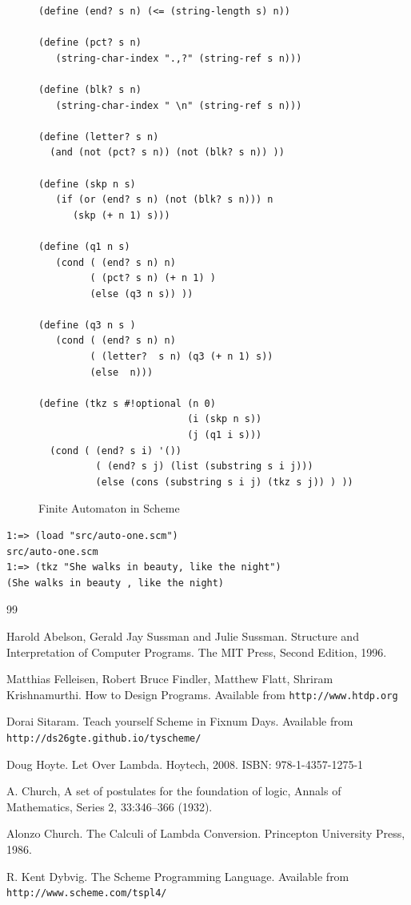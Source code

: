 \documentclass[a4paper,12pt]{book}
\newenvironment{fmpage}[1]
           {\begin{lrbox}{\fmbox}\begin{minipage}{#1}}
           {\end{minipage}\end{lrbox}\fbox{\usebox{\fmbox}}}
\begin{document}
\begin{figure}[!h]
\begin{fmpage}{0.9\linewidth}
\begin{verbatim}
(define (end? s n) (<= (string-length s) n))

(define (pct? s n)
   (string-char-index ".,?" (string-ref s n)))

(define (blk? s n)
   (string-char-index " \n" (string-ref s n)))

(define (letter? s n)
  (and (not (pct? s n)) (not (blk? s n)) ))

(define (skp n s)
   (if (or (end? s n) (not (blk? s n))) n
      (skp (+ n 1) s)))

(define (q1 n s)
   (cond ( (end? s n) n)
         ( (pct? s n) (+ n 1) )
         (else (q3 n s)) ))

(define (q3 n s )
   (cond ( (end? s n) n)
         ( (letter?  s n) (q3 (+ n 1) s))
         (else  n)))

(define (tkz s #!optional (n 0) 
                          (i (skp n s))
                          (j (q1 i s)))
  (cond ( (end? s i) '())
          ( (end? s j) (list (substring s i j)))
          (else (cons (substring s i j) (tkz s j)) ) ))

\end{verbatim}
\end{fmpage}
\caption{Finite Automaton in Scheme}
\label{FA-in-Scheme}
\end{figure}

\begin{verbatim}
1:=> (load "src/auto-one.scm")
src/auto-one.scm
1:=> (tkz "She walks in beauty, like the night")
(She walks in beauty , like the night)
\end{verbatim}


\begin{thebibliography}{99}


 Harold Abelson, Gerald Jay Sussman and
Julie Sussman. Structure and Interpretation of
Computer Programs. The MIT Press, Second Edition, 1996.

 Matthias Felleisen,
Robert Bruce Findler, Matthew Flatt, Shriram Krishnamurthi.
How to Design Programs.
Available from \verb|http://www.htdp.org|

 Dorai Sitaram. Teach yourself Scheme
in Fixnum Days. Available
from \verb|http://ds26gte.github.io/tyscheme/|

 Doug Hoyte. Let Over Lambda. Hoytech, 2008. ISBN: 978-1-4357-1275-1

 A. Church, A set of postulates for the foundation of logic, Annals of Mathematics, Series 2, 33:346–366 (1932).

 Alonzo Church. The Calculi of Lambda Conversion. Princepton University Press, 1986.

 R. Kent Dybvig. The Scheme Programming Language.
Available from \verb|http://www.scheme.com/tspl4/|

\end{thebibliography}

\printindex
\end{document}
